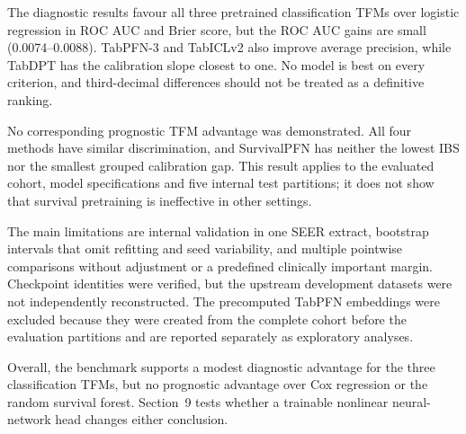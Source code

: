 The diagnostic results favour all three pretrained classification TFMs over
logistic regression in ROC AUC and Brier score, but the ROC AUC gains are small
(0.0074--0.0088).  TabPFN-3 and TabICLv2 also improve average precision, while
TabDPT has the calibration slope closest to one.  No model is best on every
criterion, and third-decimal differences should not be treated as a definitive
ranking.

No corresponding prognostic TFM advantage was demonstrated.  All four methods
have similar discrimination, and SurvivalPFN has neither the lowest IBS nor the
smallest grouped calibration gap.  This result applies to the evaluated cohort,
model specifications and five internal test partitions; it does not show that
survival pretraining is ineffective in other settings.

The main limitations are internal validation in one SEER extract, bootstrap
intervals that omit refitting and seed variability, and multiple pointwise
comparisons without adjustment or a predefined clinically important margin.
Checkpoint identities were verified, but the upstream development datasets
were not independently reconstructed.  The precomputed TabPFN embeddings were
excluded because they were created from the complete cohort before the
evaluation partitions and are reported separately as exploratory analyses.

Overall, the benchmark supports a modest diagnostic advantage for the three
classification TFMs, but no prognostic advantage over Cox regression or the
random survival forest.  Section~9 tests whether a trainable nonlinear
neural-network head changes either conclusion.

